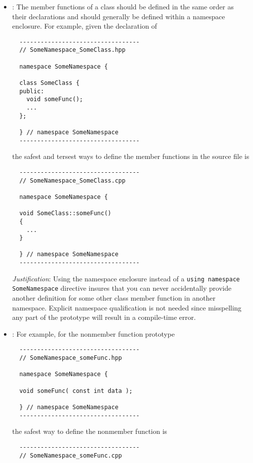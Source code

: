 \begin{itemize}
\item\GCGNamespaceClassFuncDefs: The member functions of a class
  should be defined in the same order as their declarations and should
  generally be defined within a namespace enclosure.  For example,
  given the declaration of

{\small\begin{verbatim}
  ----------------------------------
  // SomeNamespace_SomeClass.hpp

  namespace SomeNamespace {

  class SomeClass {
  public:
    void someFunc();
    ...
  };

  } // namespace SomeNamespace
  ----------------------------------
\end{verbatim}}

the safest and tersest ways to define the member functions in the
source file is

{\small\begin{verbatim}
  ----------------------------------
  // SomeNamespace_SomeClass.cpp

  namespace SomeNamespace {

  void SomeClass::someFunc()
  {
    ...
  }

  } // namespace SomeNamespace
  ----------------------------------
\end{verbatim}}

\textit{Justification}: Using the namespace enclosure instead of a
\texttt{using namespace SomeNamespace} directive insures that you can
never accidentally provide another definition for some other class
member function in another namespace.  Explicit namespace
qualification is not needed since misspelling any part of the
prototype will result in a compile-time error.


\item\GCGNamespaceFuncDefs: For example, for the nonmember function
  prototype

{\small\begin{verbatim}
  ----------------------------------
  // SomeNamespace_someFunc.hpp

  namespace SomeNamespace {

  void someFunc( const int data );

  } // namespace SomeNamespace
  ----------------------------------
\end{verbatim}}

the safest way to define the nonmember function is

{\small\begin{verbatim}
  ----------------------------------
  // SomeNamespace_someFunc.cpp


\end{verbatim}}
\end{itemize}
